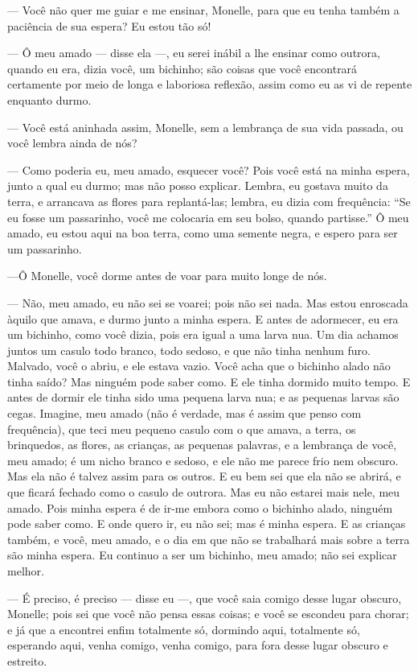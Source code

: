 --- Você não quer me guiar e me ensinar, Monelle, para que eu tenha
também a paciência de sua espera? Eu estou tão só!

--- Ô meu amado --- disse ela ---, eu serei inábil a lhe ensinar como outrora,
quando eu era, dizia você, um bichinho; são coisas que você encontrará
certamente por meio de longa e laboriosa reflexão, assim como eu as vi de
repente enquanto durmo.

--- Você está aninhada assim, Monelle, sem a lembrança de sua vida
passada, ou você lembra ainda de nós?

--- Como poderia eu, meu amado, esquecer você? Pois você está na minha
espera, junto a qual eu durmo; mas não posso explicar. Lembra, eu gostava
muito da terra, e arrancava as flores para replantá-las; lembra, eu dizia
com frequência: “Se eu fosse um passarinho, você me colocaria em seu
bolso, quando partisse.” Ô meu amado, eu estou aqui na boa terra, como uma
semente negra, e espero para ser um passarinho.

---Ô Monelle, você dorme antes de voar para muito longe de nós.

--- Não, meu amado, eu não sei se voarei; pois não sei nada. Mas estou
enroscada àquilo que amava, e durmo junto a minha espera. E antes de
adormecer, eu era um bichinho, como você dizia, pois era igual a uma larva
nua. Um dia achamos juntos um casulo todo branco, todo sedoso, e que não
tinha nenhum furo. Malvado, você o abriu, e ele estava vazio. Você acha
que o bichinho alado não tinha saído? Mas ninguém pode saber como. E ele
tinha dormido muito tempo. E antes de dormir ele tinha sido uma pequena
larva nua; e as pequenas larvas são cegas. Imagine, meu amado (não é
verdade, mas é assim que penso com frequência), que teci meu pequeno
casulo com o que amava, a terra, os brinquedos, as flores, as crianças, as
pequenas palavras, e a lembrança de você, meu amado; é um nicho branco e
sedoso, e ele não me parece frio nem obscuro. Mas ela não é talvez assim
para os outros. E eu bem sei que ela não se abrirá, e que ficará fechado
como o casulo de outrora. Mas eu não estarei mais nele, meu amado. Pois
minha espera é de ir-me embora como o bichinho alado, ninguém pode saber
como. E onde quero ir, eu não sei; mas é minha espera. E as crianças
também, e você, meu amado, e o dia em que não se trabalhará mais sobre a
terra são minha espera. Eu continuo a ser um bichinho, meu amado; não sei
explicar melhor.

--- É preciso, é preciso --- disse eu ---, que você saia comigo desse lugar
obscuro, Monelle; pois sei que você não pensa essas coisas; e você se
escondeu para chorar; e já que a encontrei enfim totalmente só, dormindo
aqui, totalmente só, esperando aqui, venha comigo, venha comigo, para fora
desse lugar obscuro e estreito.

